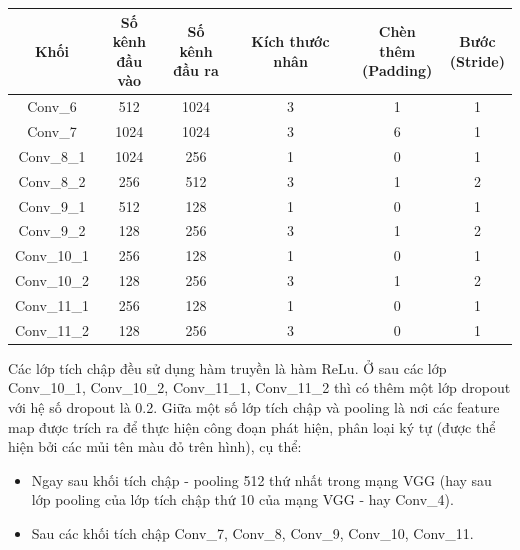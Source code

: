 \documentclass[a4paper,12pt]{article}
\begin{document}
	\begin{center}
		\begin{tabular}{||c | c | c | c | c | c ||} 
			\hline
			Khối & \makecell{ Số kênh \\ đầu vào } & \makecell{ Số kênh \\ đầu ra} & Kích thước nhân &  \makecell{ Chèn thêm \\ (Padding) } &  \makecell{ Bước \\ (Stride) } \\ [0.5ex] 
			\hline\hline
			Conv\_6 & 512 & 1024 & 3 & 1 & 1 \\ 
			\hline
			Conv\_7 & 1024 & 1024 & 3 & 6 & 1 \\ 
			\hline
			Conv\_8\_1 & 1024 & 256 & 1 & 0 & 1 \\ 
			\hline
			Conv\_8\_2 & 256 & 512 & 3 & 1 & 2 \\ 
			\hline
			Conv\_9\_1 & 512 & 128 & 1 & 0 & 1 \\ 
			\hline
			Conv\_9\_2 & 128 & 256 & 3 & 1 & 2 \\ 
			\hline
			Conv\_10\_1 & 256 & 128 & 1 & 0 & 1 \\ 
			\hline
			Conv\_10\_2 & 128 & 256 & 3 & 1 & 2 \\ 
			\hline
			Conv\_11\_1 & 256 & 128 & 1 & 0 & 1 \\ 
			\hline
			Conv\_11\_2 & 128 & 256 & 3 & 0 & 1 \\ 
			\hline
		\end{tabular}
	\end{center}
	
	
	Các lớp tích chập đều sử dụng hàm truyền là hàm ReLu\cite{relu}. Ở sau các lớp Conv\_10\_1, Conv\_10\_2, Conv\_11\_1, Conv\_11\_2 thì có thêm một lớp dropout\cite{srivastava2014dropout} với hệ số dropout là 0.2. Giữa một số lớp tích chập và pooling là nơi các feature map được trích ra để thực hiện công đoạn phát hiện, phân loại ký tự (được thể hiện bởi các mủi tên màu đỏ trên hình), cụ thể:
	
	\begin{itemize}
		\item Ngay sau khối tích chập - pooling 512 thứ nhất trong mạng VGG\cite{simonyan2014very} (hay sau lớp pooling của lớp tích chập thứ 10 của mạng VGG\cite{simonyan2014very} - hay Conv\_4).
		\item Sau các khối tích chập Conv\_7, Conv\_8, Conv\_9, Conv\_10, Conv\_11.
	\end{itemize}
	
\end{document}
